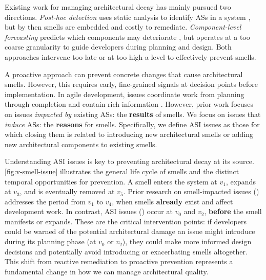 Existing work for managing architectural decay has mainly pursued two directions.
\emph{Post-hoc detection} uses static analysis to identify \aclp{AS} in a system \cite{fontana_2017,schmittlaser_ARCADEExtensible_2020}, but by then smells are embedded and costly to remediate.
\emph{Component-level forecasting} predicts which components may deteriorate \cite{garcia_2022}, but operates at a too coarse granularity to guide developers during planning and design. 
Both approaches intervene too late or at too high a level to effectively prevent smells.

A proactive approach can prevent concrete changes that cause architectural smells.
However, this requires early, fine-grained signals at decision points before implementation.
In agile development, issues coordinate work from planning through completion and contain rich information \cite{le_2018,xiao_detecting_2022,maarleveld_MaestroDeep_2024,soliman_exploratory_2021}.
However, prior work focuses on issues \emph{impacted by} existing \aclp{AS}: the \textbf{results} of smells.
We focus on issues that \emph{induce} \aclp{AS}: the \textbf{reasons} for smells.
Specifically, we define \ac{ASI} issues as those for which closing them is related to introducing new architectural smells or adding new architectural components to existing smells.



Understanding \ac{ASI} issues is key to preventing architectural decay at its source.
\autoref{fig:v-smell-issue} illustrates the general life cycle of smells and the distinct temporal opportunities for prevention.
A smell enters the system at $v_1$, expands at $v_3$, and is eventually removed at $v_5$.
Prior research on smell-impacted issues () addresses the period from $v_1$ to $v_4$, when smells \textbf{already} exist and affect development work.
In contrast, \ac{ASI} issues () occur at $v_0$ and $v_2$, \textbf{before} the smell manifests or expands.
These are the critical intervention points: if developers could be warned of the potential architectural damage an issue might introduce during its planning phase (at $v_0$ or $v_2$), they could make more informed design decisions and potentially avoid introducing or exacerbating smells altogether.
This shift from reactive remediation to proactive prevention represents a fundamental change in how we can manage architectural quality.


